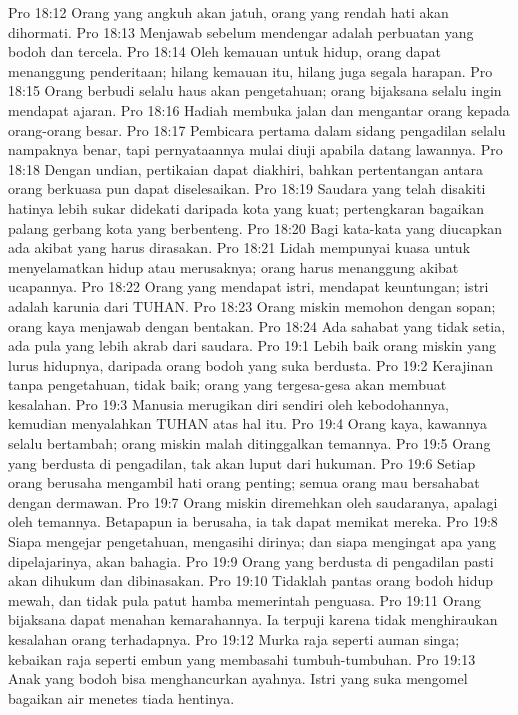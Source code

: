 Pro 18:12  Orang yang angkuh akan jatuh, orang yang rendah hati akan dihormati.
Pro 18:13  Menjawab sebelum mendengar adalah perbuatan yang bodoh dan tercela.
Pro 18:14  Oleh kemauan untuk hidup, orang dapat menanggung penderitaan; hilang kemauan itu, hilang juga segala harapan.
Pro 18:15  Orang berbudi selalu haus akan pengetahuan; orang bijaksana selalu ingin mendapat ajaran.
Pro 18:16  Hadiah membuka jalan dan mengantar orang kepada orang-orang besar.
Pro 18:17  Pembicara pertama dalam sidang pengadilan selalu nampaknya benar, tapi pernyataannya mulai diuji apabila datang lawannya.
Pro 18:18  Dengan undian, pertikaian dapat diakhiri, bahkan pertentangan antara orang berkuasa pun dapat diselesaikan.
Pro 18:19  Saudara yang telah disakiti hatinya lebih sukar didekati daripada kota yang kuat; pertengkaran bagaikan palang gerbang kota yang berbenteng.
Pro 18:20  Bagi kata-kata yang diucapkan ada akibat yang harus dirasakan.
Pro 18:21  Lidah mempunyai kuasa untuk menyelamatkan hidup atau merusaknya; orang harus menanggung akibat ucapannya.
Pro 18:22  Orang yang mendapat istri, mendapat keuntungan; istri adalah karunia dari TUHAN.
Pro 18:23  Orang miskin memohon dengan sopan; orang kaya menjawab dengan bentakan.
Pro 18:24  Ada sahabat yang tidak setia, ada pula yang lebih akrab dari saudara.
Pro 19:1  Lebih baik orang miskin yang lurus hidupnya, daripada orang bodoh yang suka berdusta.
Pro 19:2  Kerajinan tanpa pengetahuan, tidak baik; orang yang tergesa-gesa akan membuat kesalahan.
Pro 19:3  Manusia merugikan diri sendiri oleh kebodohannya, kemudian menyalahkan TUHAN atas hal itu.
Pro 19:4  Orang kaya, kawannya selalu bertambah; orang miskin malah ditinggalkan temannya.
Pro 19:5  Orang yang berdusta di pengadilan, tak akan luput dari hukuman.
Pro 19:6  Setiap orang berusaha mengambil hati orang penting; semua orang mau bersahabat dengan dermawan.
Pro 19:7  Orang miskin diremehkan oleh saudaranya, apalagi oleh temannya. Betapapun ia berusaha, ia tak dapat memikat mereka.
Pro 19:8  Siapa mengejar pengetahuan, mengasihi dirinya; dan siapa mengingat apa yang dipelajarinya, akan bahagia.
Pro 19:9  Orang yang berdusta di pengadilan pasti akan dihukum dan dibinasakan.
Pro 19:10  Tidaklah pantas orang bodoh hidup mewah, dan tidak pula patut hamba memerintah penguasa.
Pro 19:11  Orang bijaksana dapat menahan kemarahannya. Ia terpuji karena tidak menghiraukan kesalahan orang terhadapnya.
Pro 19:12  Murka raja seperti auman singa; kebaikan raja seperti embun yang membasahi tumbuh-tumbuhan.
Pro 19:13  Anak yang bodoh bisa menghancurkan ayahnya. Istri yang suka mengomel bagaikan air menetes tiada hentinya.
